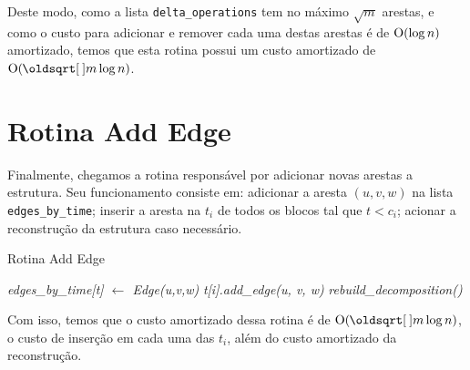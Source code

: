 Deste modo, como a lista \texttt{delta\_operations} tem no máximo $\sqrt{m}$ arestas, e como o custo para adicionar e remover cada uma destas arestas é de $\mathrm{O}(\log{n})$ amortizado, temos que esta rotina possui um custo amortizado de $\Oh(\sqrt{m} \log{n})$.

\section{Rotina Add Edge}
\label{sec:rmsf-add-edge}

Finalmente, chegamos a rotina responsável por adicionar novas arestas a estrutura. Seu funcionamento consiste em: adicionar a aresta $(u,v,w)$ na lista \texttt{edges\_by\_time}; inserir a aresta na $t_i$ de todos os blocos tal que $t < c_i$; acionar a reconstrução da estrutura caso necessário.

\begin{algorithm}[h!]
    \caption{Rotina Add Edge}\label{rmsf-add-edge}
    \begin{algorithmic}[1]
        \State \emph{edges\_by\_time[t] $\gets$ Edge(u,v,w)}
        \State \emph{t[i].add\_edge(u, v, w)}
        \EndFor
        \State \emph{rebuild\_decomposition()}
        \EndIf
        \EndFunction
    \end{algorithmic}
\end{algorithm}

Com isso, temos que o custo amortizado dessa rotina é de $\Oh(\sqrt{m} \log{n})$, o custo de inserção em cada uma das $t_i$, além do custo amortizado da reconstrução.